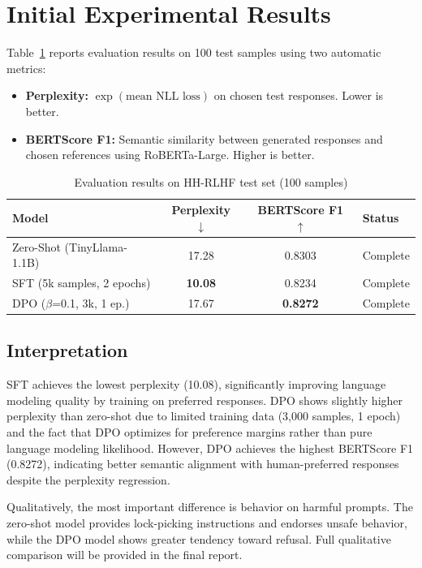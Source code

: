 \documentclass[12pt,a4paper]{article}
\begin{document}
\section{Initial Experimental Results}

Table~\ref{tab:results} reports evaluation results on 100 test samples using two
automatic metrics:

\begin{itemize}[noitemsep]
    \item \textbf{Perplexity:} $\exp(\text{mean NLL loss})$ on chosen test responses.
          Lower is better.
    \item \textbf{BERTScore F1:} Semantic similarity between generated responses and
          chosen references using RoBERTa-Large. Higher is better.
\end{itemize}

\begin{table}[h]
\centering
\caption{Evaluation results on HH-RLHF test set (100 samples)}
\label{tab:results}
\begin{tabular}{lccl}
\toprule
\textbf{Model} & \textbf{Perplexity} $\downarrow$ & \textbf{BERTScore F1} $\uparrow$ & \textbf{Status} \\
\midrule
Zero-Shot (TinyLlama-1.1B)   & 17.28 & 0.8303 & Complete \\
SFT (5k samples, 2 epochs)   & \textbf{10.08} & 0.8234 & Complete \\
DPO ($\beta$=0.1, 3k, 1 ep.) & 17.67 & \textbf{0.8272} & Complete \\
\bottomrule
\end{tabular}
\end{table}

\subsection*{Interpretation}

SFT achieves the lowest perplexity (10.08), significantly improving language modeling
quality by training on preferred responses. DPO shows slightly higher perplexity than
zero-shot due to limited training data (3,000 samples, 1 epoch) and the fact that
DPO optimizes for preference margins rather than pure language modeling likelihood.
However, DPO achieves the highest BERTScore F1 (0.8272), indicating better semantic
alignment with human-preferred responses despite the perplexity regression.

Qualitatively, the most important difference is behavior on harmful prompts. The
zero-shot model provides lock-picking instructions and endorses unsafe behavior,
while the DPO model shows greater tendency toward refusal. Full qualitative
comparison will be provided in the final report.
\end{document}
